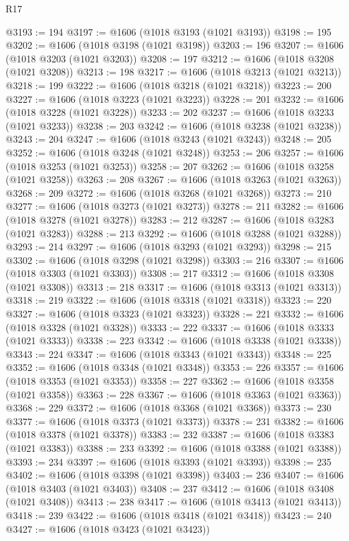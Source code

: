 \begin{lexlean}{R17}
\begin{coremodule}
@3193 := 194
@3197 := @1606 (@1018 @3193 (@1021 @3193))
@3198 := 195
@3202 := @1606 (@1018 @3198 (@1021 @3198))
@3203 := 196
@3207 := @1606 (@1018 @3203 (@1021 @3203))
@3208 := 197
@3212 := @1606 (@1018 @3208 (@1021 @3208))
@3213 := 198
@3217 := @1606 (@1018 @3213 (@1021 @3213))
@3218 := 199
@3222 := @1606 (@1018 @3218 (@1021 @3218))
@3223 := 200
@3227 := @1606 (@1018 @3223 (@1021 @3223))
@3228 := 201
@3232 := @1606 (@1018 @3228 (@1021 @3228))
@3233 := 202
@3237 := @1606 (@1018 @3233 (@1021 @3233))
@3238 := 203
@3242 := @1606 (@1018 @3238 (@1021 @3238))
@3243 := 204
@3247 := @1606 (@1018 @3243 (@1021 @3243))
@3248 := 205
@3252 := @1606 (@1018 @3248 (@1021 @3248))
@3253 := 206
@3257 := @1606 (@1018 @3253 (@1021 @3253))
@3258 := 207
@3262 := @1606 (@1018 @3258 (@1021 @3258))
@3263 := 208
@3267 := @1606 (@1018 @3263 (@1021 @3263))
@3268 := 209
@3272 := @1606 (@1018 @3268 (@1021 @3268))
@3273 := 210
@3277 := @1606 (@1018 @3273 (@1021 @3273))
@3278 := 211
@3282 := @1606 (@1018 @3278 (@1021 @3278))
@3283 := 212
@3287 := @1606 (@1018 @3283 (@1021 @3283))
@3288 := 213
@3292 := @1606 (@1018 @3288 (@1021 @3288))
@3293 := 214
@3297 := @1606 (@1018 @3293 (@1021 @3293))
@3298 := 215
@3302 := @1606 (@1018 @3298 (@1021 @3298))
@3303 := 216
@3307 := @1606 (@1018 @3303 (@1021 @3303))
@3308 := 217
@3312 := @1606 (@1018 @3308 (@1021 @3308))
@3313 := 218
@3317 := @1606 (@1018 @3313 (@1021 @3313))
@3318 := 219
@3322 := @1606 (@1018 @3318 (@1021 @3318))
@3323 := 220
@3327 := @1606 (@1018 @3323 (@1021 @3323))
@3328 := 221
@3332 := @1606 (@1018 @3328 (@1021 @3328))
@3333 := 222
@3337 := @1606 (@1018 @3333 (@1021 @3333))
@3338 := 223
@3342 := @1606 (@1018 @3338 (@1021 @3338))
@3343 := 224
@3347 := @1606 (@1018 @3343 (@1021 @3343))
@3348 := 225
@3352 := @1606 (@1018 @3348 (@1021 @3348))
@3353 := 226
@3357 := @1606 (@1018 @3353 (@1021 @3353))
@3358 := 227
@3362 := @1606 (@1018 @3358 (@1021 @3358))
@3363 := 228
@3367 := @1606 (@1018 @3363 (@1021 @3363))
@3368 := 229
@3372 := @1606 (@1018 @3368 (@1021 @3368))
@3373 := 230
@3377 := @1606 (@1018 @3373 (@1021 @3373))
@3378 := 231
@3382 := @1606 (@1018 @3378 (@1021 @3378))
@3383 := 232
@3387 := @1606 (@1018 @3383 (@1021 @3383))
@3388 := 233
@3392 := @1606 (@1018 @3388 (@1021 @3388))
@3393 := 234
@3397 := @1606 (@1018 @3393 (@1021 @3393))
@3398 := 235
@3402 := @1606 (@1018 @3398 (@1021 @3398))
@3403 := 236
@3407 := @1606 (@1018 @3403 (@1021 @3403))
@3408 := 237
@3412 := @1606 (@1018 @3408 (@1021 @3408))
@3413 := 238
@3417 := @1606 (@1018 @3413 (@1021 @3413))
@3418 := 239
@3422 := @1606 (@1018 @3418 (@1021 @3418))
@3423 := 240
@3427 := @1606 (@1018 @3423 (@1021 @3423))

\end{coremodule}
\end{lexlean}
